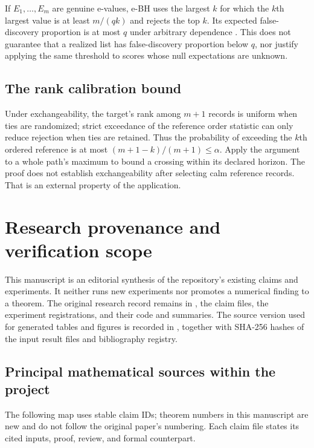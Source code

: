 If $E_1,\ldots,E_m$ are genuine e-values, e-BH uses the largest
$k$ for which the $k$th largest value is at least $m/(qk)$ and
rejects the top $k$. Its expected false-discovery proportion is at
most $q$ under arbitrary dependence \cite{wang2020false}. This
does not guarantee that a realized list has false-discovery
proportion below $q$, nor justify applying the same threshold to
scores whose null expectations are unknown.

\subsection{The rank calibration bound}
Under exchangeability, the target's rank among $m+1$ records is
uniform when ties are randomized; strict exceedance of the reference
order statistic can only reduce rejection when ties are retained.
Thus the probability of exceeding the $k$th ordered reference is
at most $(m+1-k)/(m+1)\leq\alpha$. Apply the argument to a whole
path's maximum to bound a crossing within its declared horizon.
The proof does not establish exchangeability after selecting calm
reference records. That is an external property of the application.

\clearpage
\section{Research provenance and verification scope}\label{app:record}
This manuscript is an editorial synthesis of the repository's existing
claims and experiments. It neither runs new experiments nor promotes a
numerical finding to a theorem. The original research record remains
in , the claim files, the experiment registrations,
and their code and summaries. The source version used for generated
tables and figures is recorded in
, together with SHA-256
hashes of the input result files and bibliography registry.

\subsection{Principal mathematical sources within the project}
The following map uses stable claim IDs; theorem numbers in this
manuscript are new and do not follow the original paper's numbering.
Each claim file states its cited inputs, proof, review, and formal
counterpart.


